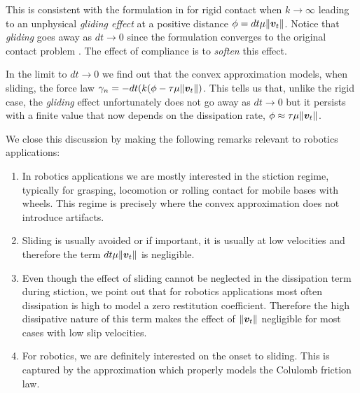 This is consistent with the formulation in \cite{bib:anitescu2010} for rigid
contact when $k\rightarrow \infty$ leading to an unphysical \textit{gliding
effect} at a positive distance $\phi=dt\mu\Vert{\bm{v}}_t\Vert$. Notice that
\textit{gliding} goes away as $dt\rightarrow 0$ since the formulation converges
to the original contact problem \cite{bib:anitescu2006}. The effect of
compliance is to \textit{soften} this effect. 

In the limit to $dt\rightarrow 0$ we find out that the convex approximation
models, when sliding, the force law
$\gamma_n=-dt(k(\phi-\tau\mu\Vert{\bm{v}}_t\Vert)$. This tells us that, unlike the
rigid case, the \textit{gliding} effect unfortunately does not go away as
$dt\rightarrow 0$ but it persists with a finite value that now depends on the
dissipation rate, $\phi\approx\tau\mu\Vert{\bm{v}}_t\Vert$.

We close this discussion by making the following remarks relevant to robotics
applications:
\begin{enumerate}
	\item In robotics applications we are mostly interested in the stiction
	regime, typically for grasping, locomotion or rolling contact for mobile
	bases with wheels. This regime is precisely where the convex approximation
	does not introduce artifacts.
	\item Sliding is usually avoided or if important, it is usually at low
	velocities and therefore the term $dt\mu\Vert{\bm{v}}_t\Vert$ is negligible.
	\item Even though the effect of sliding cannot be neglected in the
	dissipation term during stiction, we point out that for robotics
	applications most often dissipation is high to model a zero restitution
	coefficient. Therefore the high dissipative nature of this term makes the
	effect of $\Vert{\bm{v}}_t\Vert$ negligible for most cases with low slip
	velocities.
	\item For robotics, we are definitely interested on the onset to sliding.
	This is captured by the approximation which properly models the Colulomb
	friction law.
\end{enumerate}
